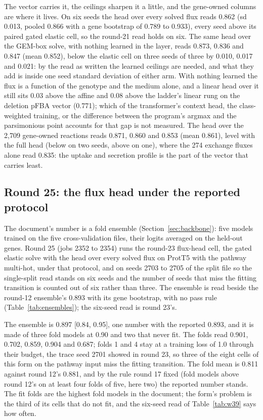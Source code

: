 The vector carries it, the ceilings sharpen it a little, and the gene-owned columns are
where it lives. On six seeds the head over every solved flux reads 0.862 (sd 0.013,
pooled 0.866 with a gene bootstrap of 0.789 to 0.933), every seed above its paired
gated elastic cell, so the round-21 read holds on six. The same head over the GEM-box
solve, with nothing learned in the layer, reads 0.873, 0.836 and 0.847 (mean 0.852),
below the elastic cell on three seeds of three by 0.010, 0.017 and 0.021: by the read
as written the learned ceilings are needed, and what they add is inside one seed
standard deviation of either arm. With nothing learned the flux is a function of the
genotype and the medium alone, and a linear head over it still sits 0.03 above the
affine and 0.08 above the ladder's linear rung on the deletion pFBA vector (0.771);
which of the transformer's context head, the class-weighted training, or the
difference between the program's argmax and the parsimonious point accounts for that
gap is not measured. The head over the 2,709 gene-owned reactions reads 0.871, 0.860
and 0.853 (mean 0.861), level with the full head (below on two seeds, above on one),
where the 274 exchange fluxes alone read 0.835: the uptake and secretion profile is
the part of the vector that carries least.

\subsection{Round 25: the flux head under the reported protocol}
\label{sec:round25}

The document's number is a fold ensemble (Section~\ref{sec:backbone}): five models
trained on the five cross-validation files, their logits averaged on the held-out
genes. Round 25 (jobs 2352 to 2354) runs the round-23 flux-head cell, the gated
elastic solve with the head over every solved flux on ProtT5 with the pathway
multi-hot, under that protocol, and on seeds 2703 to 2705 of the split file so the
single-split read stands on six seeds and the number of seeds that miss the fitting
transition is counted out of six rather than three. The ensemble is read beside the
round-12 ensemble's 0.893 with its gene bootstrap, with no pass rule
(Table~\ref{tab:ensembles}); the six-seed read is round 23's.



The ensemble is 0.897 [0.84, 0.95], one number with the reported 0.893, and it is made
of three fold models at 0.90 and two that never fit. The folds read 0.901, 0.702,
0.859, 0.904 and 0.687; folds 1 and 4 stay at a training loss of 1.0 through their
budget, the trace seed 2701 showed in round 23, so three of the eight cells of this
form on the pathway input miss the fitting transition. The fold mean is 0.811 against
round 12's 0.881, and by the rule round 17 fixed (fold models above round 12's on at
least four folds of five, here two) the reported number stands. The fit folds are the
highest fold models in the document; the form's problem is the third of its cells that
do not fit, and the six-seed read of Table~\ref{tab:w39} says how often.

